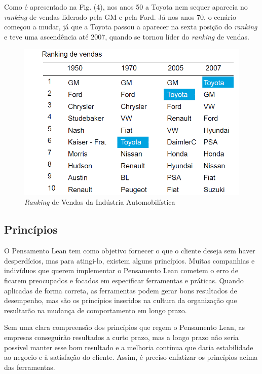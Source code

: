 Como é apresentado na Fig. (4), nos anos 50 a Toyota nem sequer aparecia no \textit{ranking} de vendas liderado pela GM e pela Ford. Já nos anos 70, o cenário começou a mudar, já que a Toyota passou a aparecer na sexta posição do \textit{ranking} e teve uma ascendência até 2007, quando se tornou líder do \textit{ranking} de vendas.

\begin{figure}[H]
		\centering
		\label{fig01}
			\includegraphics[scale=0.5]{figuras/ranking.png}
		\caption{\textit{Ranking} de Vendas da Indústria Automobilística  \cite{ranking}}
\end{figure}

\subsection[Princípios]{Princípios}

O Pensamento Lean tem como objetivo fornecer o que o cliente deseja sem haver desperdícios, mas para atingi-lo, existem alguns princípios. Muitas companhias e indivíduos que querem implementar o Pensamento Lean cometem o erro de ficarem preocupados e focados em especificar ferramentas e práticas. Quando aplicadas de forma correta, as ferramentas podem gerar bons resultados de desempenho, mas são os princípios inseridos na cultura da organização que resultarão na mudança de comportamento em longo prazo. 

Sem uma clara compreensão dos princípios que regem o Pensamento Lean, as empresas conseguirão resultados a curto prazo, mas a longo prazo não seria possível manter esse bom resultado e a melhoria contínua que daria estabilidade ao negocio e à satisfação do cliente. Assim, é preciso enfatizar os princípios acima das ferramentas. 

